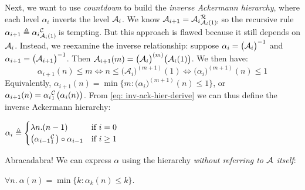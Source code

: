 Next, we want to use \emph{countdown} to build the \emph{inverse Ackermann hierarchy}, where each
level $\alpha_i$ inverts the level $\mathcal{A}_i$.
We know $\Ack_{i+1} = \rf{\Ack_i}{\Ack_i(1)}$\hspace{0.2em}, so the recursive
rule $\alpha_{i+1} \triangleq \cdt{\alpha_i}{\Ack_i(1)}$ is tempting.
But this approach is flawed because it still depends on $\mathcal{A}_i$.
Instead, we reexamine the inverse relationship: suppose $\alpha_i = \big(\mathcal{A}_i\big)^{-1}$ and $\alpha_{i+1} = \big(\mathcal{A}_{i+1}\big)^{-1}$. Then $\mathcal{A}_{i+1}(m) = \big(\mathcal{A}_{i}\big)^{(m)} \big(\mathcal{A}_{i}(1)\big)$. We then have:
\begin{equation} \label{eq: inv-ack-hier-derive}
\alpha_{i+1}(n)\le m \iff n\le \big(\mathcal{A}_i\big)^{(m+1)}(1) \iff \big(\alpha_i\big)^{(m+1)}(n) \le 1
\end{equation}
Equivalently, $\alpha_{i+1}(n) = \min\big\{m : \big( \alpha_i \big)^{(m+1)}(n)\le 1\big\}$, or $\alpha_{i+1}(n) = \cdt{\alpha_i}{1}\big(\alpha_i(n)\big)$. From \eqref{eq: inv-ack-hier-derive} we can thus define the inverse Ackermann hierarchy:
\begin{defn} \label{defn: inv-ack-hier}
	$ \alpha_i \triangleq \begin{cases}
	\lambda n.(n - 1) & \text{if } i = 0
	\\ \big(\cdt{\alpha_{i-1}}{1}\big)\circ \alpha_{i-1} & \text{if } i\ge 1 \end{cases}
$
\end{defn}
Abracadabra! We can express $\alpha$ using the hierarchy \emph{without referring to $\mathcal{A}$ itself}:
\begin{thm} \label{thm: inv-ack-new}
	$\forall n.~ \alpha(n) = \min\big\{k : \alpha_k(n)\le k \big\}$.
\end{thm}


